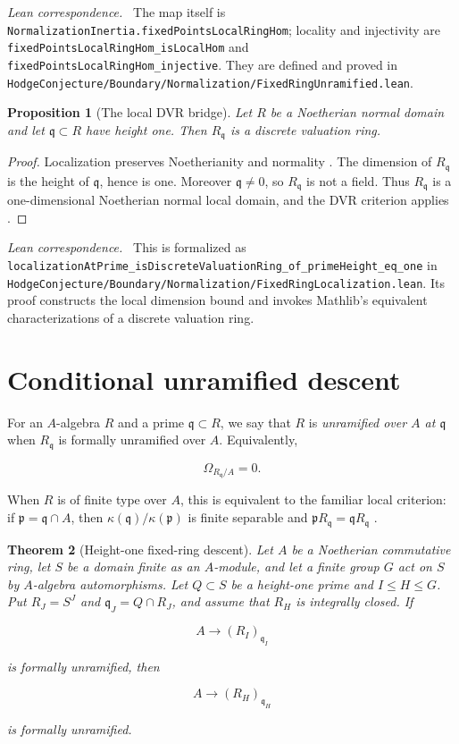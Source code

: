 \documentclass[11pt]{article}
\newtheorem{theorem}{Theorem}[section]
\newtheorem{proposition}[theorem]{Proposition}
\theoremstyle{remark}
\newcommand{\kq}[1]{\kappa(#1)}
\newcommand{\p}{\mathfrak p}
\newcommand{\q}{\mathfrak q}
\newcommand{\leanpath}[1]{\texttt{\nolinkurl{#1}}}
\newcommand{\leansrc}[1]{%
  \leanpath{HodgeConjecture/Boundary/Normalization/#1}}
\newenvironment{leanfiles}
  {\par\medskip\begingroup\footnotesize\raggedright\noindent
   \textit{Lean correspondence.}\ }
  {\par\endgroup\medskip}
\begin{document}
\begin{leanfiles}
The map itself is
\leanpath{NormalizationInertia.fixedPointsLocalRingHom}; locality and
injectivity are
\leanpath{fixedPointsLocalRingHom_isLocalHom} and
\leanpath{fixedPointsLocalRingHom_injective}.  They are defined and proved
in \leansrc{FixedRingUnramified.lean}.
\end{leanfiles}

\begin{proposition}[The local DVR bridge]
\label{prop:dvr}
Let \(R\) be a Noetherian normal domain and let \(\q\subset R\) have height
one.  Then \(R_{\q}\) is a discrete valuation ring.
\end{proposition}

\begin{proof}
Localization preserves Noetherianity and normality
\cite{StacksNoetherianLocalization,StacksNormalLocalization}.  The
dimension of \(R_{\q}\) is the height of
\(\q\), hence is one.  Moreover \(\q\neq0\), so \(R_{\q}\) is not a field.
Thus \(R_{\q}\) is a one-dimensional Noetherian normal local domain, and
the DVR criterion applies \cite{StacksDVRCriterion}.
\end{proof}

\begin{leanfiles}
This is formalized as
\leanpath{localizationAtPrime_isDiscreteValuationRing_of_primeHeight_eq_one}
in \leansrc{FixedRingLocalization.lean}.  Its proof constructs the local
dimension bound and invokes Mathlib's equivalent characterizations of a
discrete valuation ring.
\end{leanfiles}

\section{Conditional unramified descent}
\label{sec:unramified}

For an \(A\)-algebra \(R\) and a prime \(\q\subset R\), we say that \(R\)
is \emph{unramified over \(A\) at \(\q\)} when \(R_{\q}\) is formally
unramified over \(A\).  Equivalently,

\[
  \Omega_{R_{\q}/A}=0.
\]

When \(R\) is of finite type over \(A\), this is equivalent to the familiar
local criterion: if \(\p=\q\cap A\), then
\(\kq{\q}/\kq{\p}\) is finite separable and
\(\p R_{\q}=\q R_{\q}\)
\cite{StacksUnramifiedNecessary,StacksUnramifiedLocalCriterion}.

\begin{theorem}[Height-one fixed-ring descent]
\label{thm:fixed-ring-descent}
Let \(A\) be a Noetherian commutative ring, let \(S\) be a domain finite as an
\(A\)-module, and let a finite group \(G\) act on \(S\) by \(A\)-algebra
automorphisms.  Let \(Q\subset S\) be a height-one prime and
\(I\leq H\leq G\).  Put \(R_J=S^J\) and \(\q_J=Q\cap R_J\), and assume that
\(R_H\) is integrally closed.  If

\[
  A\longrightarrow (R_I)_{\q_I}
\]

is formally unramified, then

\[
  A\longrightarrow (R_H)_{\q_H}
\]

is formally unramified.
\end{theorem}
\end{document}
